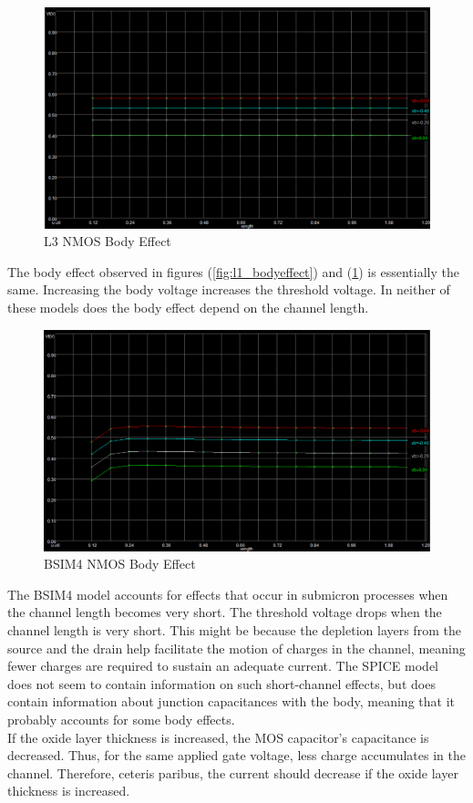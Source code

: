 \begin{figure}[h!]
	\centering
	\includegraphics[scale=0.75]{../images/l3_bodyeffect.PNG}
	\caption{L3 NMOS Body Effect}
	\label{fig:l3_bodyeffect}
\end{figure}

\FloatBarrier

The body effect observed in figures (\ref{fig:l1_bodyeffect}) and (\ref{fig:l3_bodyeffect}) is essentially the same.
Increasing the body voltage increases the threshold voltage.
In neither of these models does the body effect depend on the channel length.

\FloatBarrier

\begin{figure}[h!]
	\centering
	\includegraphics[scale=0.75]{../images/bsim4_bodyeffect.PNG}
	\caption{BSIM4 NMOS Body Effect}
	\label{fig:bsim4_bodyeffect}
\end{figure}

\FloatBarrier

The BSIM4 model accounts for effects that occur in submicron processes when the channel length becomes very short.
The threshold voltage drops when the channel length is very short.
This might be because the depletion layers from the source and the drain help facilitate the motion of charges in the channel, meaning fewer charges are required to sustain an adequate current.
The SPICE model does not seem to contain information on such short-channel effects, but does contain information about junction capacitances with the body, meaning that it probably accounts for some body effects. \\

If the oxide layer thickness is increased, the MOS capacitor's capacitance is decreased.
Thus, for the same applied gate voltage, less charge accumulates in the channel.
Therefore, ceteris paribus, the current should decrease if the oxide layer thickness is increased. \\
